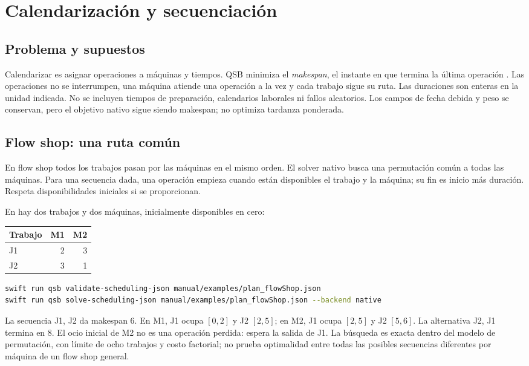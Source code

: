 \chapter{Calendarización y secuenciación}
\label{chap:calendarizacion}

\section{Problema y supuestos}
Calendarizar es asignar operaciones a máquinas y tiempos. QSB minimiza el
\emph{makespan}, el instante en que termina la última operación
\cite{pinedo2016scheduling}. Las operaciones no se interrumpen, una máquina
atiende una operación a la vez y cada trabajo sigue su ruta. Las duraciones son
enteras en la unidad indicada. No se incluyen tiempos de preparación,
calendarios laborales ni fallos aleatorios.
Los campos de fecha debida y peso se conservan, pero el objetivo nativo sigue
siendo makespan; no optimiza tardanza ponderada.

\section{Flow shop: una ruta común}
En flow shop todos los trabajos pasan por las máquinas en el mismo orden.
El solver nativo busca una permutación común a todas las máquinas. Para una
secuencia dada, una operación empieza cuando están disponibles el trabajo y
la máquina; su fin es inicio más duración. Respeta disponibilidades iniciales
si se proporcionan.

En  hay dos trabajos y dos
máquinas, inicialmente disponibles en cero:
\begin{center}
\begin{tabular}{lrr}\toprule
Trabajo & M1 & M2 \\
\midrule J1 & 2 & 3 \\ J2 & 3 & 1 \\
\bottomrule\end{tabular}
\end{center}
\begin{lstlisting}[language=bash]
swift run qsb validate-scheduling-json manual/examples/plan_flowShop.json
swift run qsb solve-scheduling-json manual/examples/plan_flowShop.json --backend native
\end{lstlisting}
La secuencia J1, J2 da makespan 6. En M1, J1 ocupa $[0,2]$ y J2 $[2,5]$;
en M2, J1 ocupa $[2,5]$ y J2 $[5,6]$. La alternativa J2, J1 termina en 8.
El ocio inicial de M2 no es una operación perdida: espera la salida de J1.
La búsqueda es exacta dentro del modelo de permutación, con límite de ocho
trabajos y costo factorial; no prueba optimalidad entre todas las posibles
secuencias diferentes por máquina de un flow shop general.

